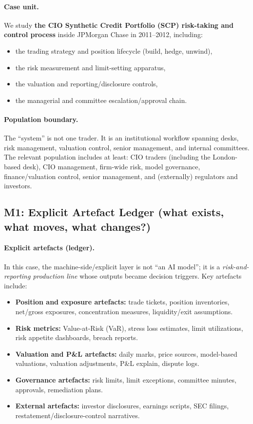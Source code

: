 \paragraph{Case unit.}
We study \textbf{the CIO Synthetic Credit Portfolio (SCP) risk-taking and control process} inside JPMorgan Chase in 2011--2012, including:
\begin{itemize}
\item the trading strategy and position lifecycle (build, hedge, unwind),
\item the risk measurement and limit-setting apparatus,
\item the valuation and reporting/disclosure controls,
\item the managerial and committee escalation/approval chain.
\end{itemize}

\paragraph{Population boundary.}
The “system” is not one trader. It is an institutional workflow spanning desks, risk management, valuation control, senior management, and internal committees. The relevant population includes at least: CIO traders (including the London-based desk), CIO management, firm-wide risk, model governance, finance/valuation control, senior management, and (externally) regulators and investors.

\subsection{M1: Explicit Artefact Ledger (what exists, what moves, what changes?)}
\label{subsec:lw-m1}

\paragraph{Explicit artefacts (ledger).}
In this case, the machine-side/explicit layer is not “an AI model”; it is a \emph{risk-and-reporting production line} whose outputs became decision triggers. Key artefacts include:

\begin{itemize}
\item \textbf{Position and exposure artefacts:} trade tickets, position inventories, net/gross exposures, concentration measures, liquidity/exit assumptions.
\item \textbf{Risk metrics:} Value-at-Risk (VaR), stress loss estimates, limit utilizations, risk appetite dashboards, breach reports.
\item \textbf{Valuation and P\&L artefacts:} daily marks, price sources, model-based valuations, valuation adjustments, P\&L explain, dispute logs.
\item \textbf{Governance artefacts:} risk limits, limit exceptions, committee minutes, approvals, remediation plans.
\item \textbf{External artefacts:} investor disclosures, earnings scripts, SEC filings, restatement/disclosure-control narratives.
\end{itemize}

